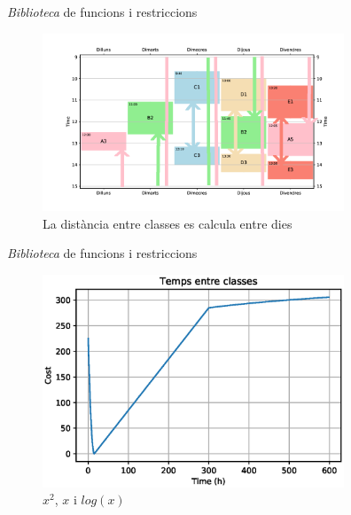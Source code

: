 \documentclass[twocolumn]{beamer}
\begin{document}
\begin{frame}{\textit{Biblioteca} de funcions i restriccions}
\begin{figure}
	\includegraphics[width=9cm]{../plots/llibreria_funcs/horari}
	\caption{La distància entre classes es calcula entre dies}
\end{figure}
\end{frame}

\begin{frame}{\textit{Biblioteca} de funcions i restriccions}
\begin{figure}
	\includegraphics[width=9cm]{interclass}
	\caption{$x^2$, $x$ i $log(x)$}
\end{figure}
\end{frame}
\end{document}
